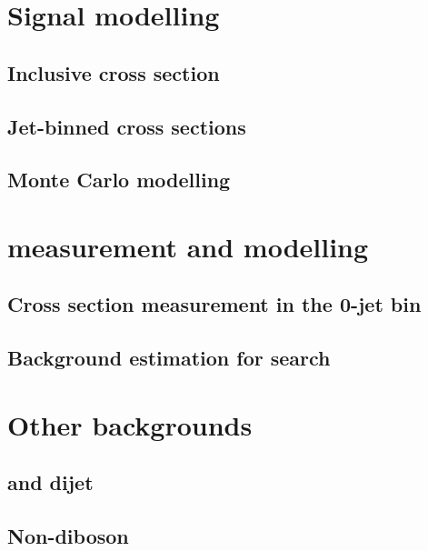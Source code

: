 \documentclass[hyper,linkcolor=blue]{mythesis}
\begin{document}
\begin{mainmatter}
  \chapter{Signal modelling}
    \label{chap:signal}
    
    \section{Inclusive cross section}
      \label{sec:ggf_inc}
      
    \section{Jet-binned cross sections}
      \label{sec:ggf_jetbin}
      
    \section{Monte Carlo modelling}
      \label{sec:ggf_mc}
      

  \chapter{\WW measurement and modelling}
    \label{chap:ww}
    
    \section{Cross section measurement in the 0-jet bin}
      \label{sec:ww_meas}
      
    \section{Background estimation for \HWW search}
      \label{sec:ww_as_bkg}
      

  \chapter{Other backgrounds}
    \label{chap:backgrounds}
    
    \section{\Wjets and dijet}
      \label{sec:wjets}
      
    \section{Non-\WW diboson}
      \label{sec:diboson}
      

\end{mainmatter}
\end{document}

